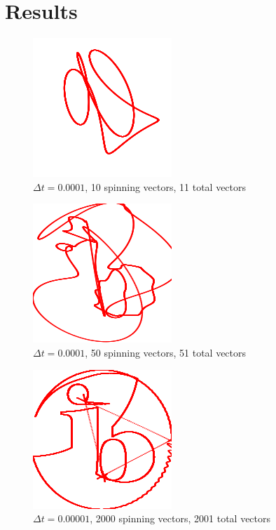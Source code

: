 \documentclass[letterpaper, 12pt]{article}
\begin{document}
\section{Results}

\begin{figure}[H]
    \centering
    \includegraphics[width=.5\textwidth]{5.png}
    \caption{\protect\(\Delta t = 0.0001\), 10 spinning vectors, 11 total vectors}
\end{figure}

\begin{figure}[H]
    \centering
    \includegraphics[width=.5\textwidth]{25.png}
    \caption{\protect\(\Delta t = 0.0001\), 50 spinning vectors, 51 total vectors}
\end{figure}

\begin{figure}[H]
    \centering
    \includegraphics[width=.5\textwidth]{1000.png}
    \caption{\protect\(\Delta t = 0.00001\), 2000 spinning vectors, 2001 total vectors}
\end{figure}
\end{document}
